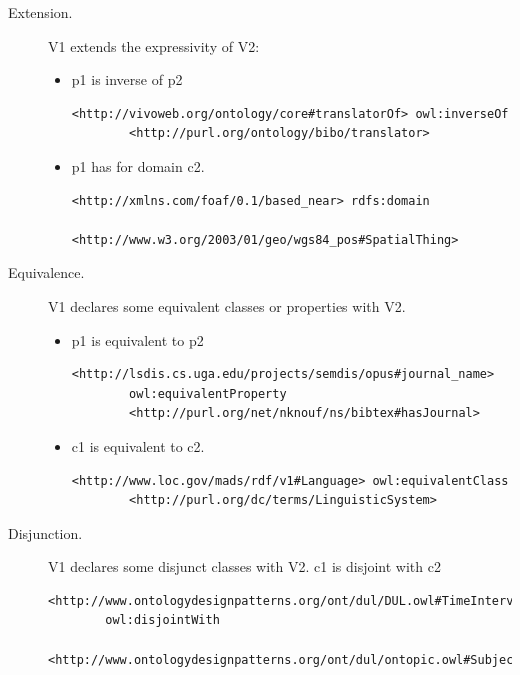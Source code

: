\documentclass{iosart2c}
\begin{document}
\begin{description}
			\item [Extension.] V1 extends the expressivity of V2:
				\begin{itemize}
					\item p1 is inverse of p2 
\begin{lstlisting}[basicstyle=\tiny,float=htb,label=list:person, language=turtle]
<http://vivoweb.org/ontology/core#translatorOf> owl:inverseOf
		<http://purl.org/ontology/bibo/translator>
\end{lstlisting}
					\item p1 has for domain c2.  
\begin{lstlisting}[basicstyle=\tiny,float=htb,label=list:person, language=turtle]
<http://xmlns.com/foaf/0.1/based_near> rdfs:domain
		<http://www.w3.org/2003/01/geo/wgs84_pos#SpatialThing>
\end{lstlisting}
				\end{itemize}

			\item [Equivalence.] V1 declares some equivalent classes or properties with V2.  
				\begin{itemize}
					\item p1 is equivalent to p2 
\begin{lstlisting}[basicstyle=\tiny,float=htb,label=list:person, language=turtle]
<http://lsdis.cs.uga.edu/projects/semdis/opus#journal_name> 
		owl:equivalentProperty 
		<http://purl.org/net/nknouf/ns/bibtex#hasJournal>
\end{lstlisting}
					\item c1 is equivalent to c2.  
\begin{lstlisting}[basicstyle=\tiny,float=htb,label=list:person, language=turtle]
<http://www.loc.gov/mads/rdf/v1#Language> owl:equivalentClass
		<http://purl.org/dc/terms/LinguisticSystem>
\end{lstlisting}
				\end{itemize}

			\item [Disjunction.] V1 declares some disjunct classes with V2. c1 is disjoint with c2 
\begin{lstlisting}[basicstyle=\tiny,float=htb,label=list:person, language=turtle]
<http://www.ontologydesignpatterns.org/ont/dul/DUL.owl#TimeInterval>
		owl:disjointWith 
		<http://www.ontologydesignpatterns.org/ont/dul/ontopic.owl#SubjectSpace>
\end{lstlisting}
		\end{description}
\end{document}
